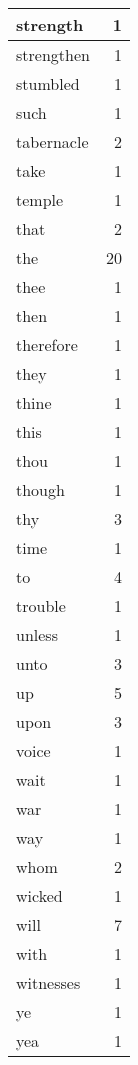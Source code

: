 \begin{center}
\begin{longtable}{l|r}
strength & 1 \\ \hline
strengthen & 1 \\ \hline
stumbled & 1 \\ \hline
such & 1 \\ \hline
tabernacle & 2 \\ \hline
take & 1 \\ \hline
temple & 1 \\ \hline
that & 2 \\ \hline
the & 20 \\ \hline
thee & 1 \\ \hline
then & 1 \\ \hline
therefore & 1 \\ \hline
they & 1 \\ \hline
thine & 1 \\ \hline
this & 1 \\ \hline
thou & 1 \\ \hline
though & 1 \\ \hline
thy & 3 \\ \hline
time & 1 \\ \hline
to & 4 \\ \hline
trouble & 1 \\ \hline
unless & 1 \\ \hline
unto & 3 \\ \hline
up & 5 \\ \hline
upon & 3 \\ \hline
voice & 1 \\ \hline
wait & 1 \\ \hline
war & 1 \\ \hline
way & 1 \\ \hline
whom & 2 \\ \hline
wicked & 1 \\ \hline
will & 7 \\ \hline
with & 1 \\ \hline
witnesses & 1 \\ \hline
ye & 1 \\ \hline
yea & 1 \\ \hline
\end{longtable}
\end{center}



\normalsize



